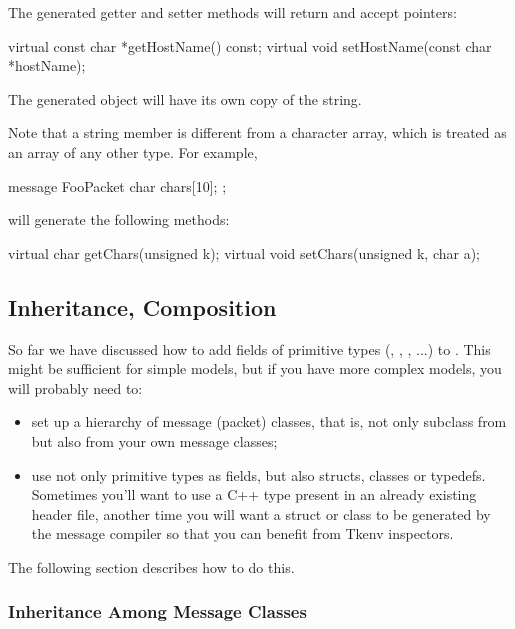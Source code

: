 The generated getter and setter methods will return and accept 
pointers:

\begin{cpp}
virtual const char *getHostName() const;
virtual void setHostName(const char *hostName);
\end{cpp}

The generated object will have its own copy of the string.

Note that a string member is different from a character array,
which is treated as an array of any other type. For example,

\begin{msg}
message FooPacket
{
    char chars[10];
};
\end{msg}

will generate the following methods:

\begin{cpp}
virtual char getChars(unsigned k);
virtual void setChars(unsigned k, char a);
\end{cpp}


\subsection{Inheritance, Composition}

So far we have discussed how to add fields of primitive types
(, , , ...) to
. This might be sufficient for simple models, but if you
have more complex models, you will probably need to:

\begin{itemize}
  \item set up a hierarchy of message (packet) classes, that is,
    not only subclass from  but also from your
    own message classes;
  \item use not only primitive types as fields, but also structs,
    classes or typedefs. Sometimes you'll want to use a C++ type
    present in an already existing header file, another time you will
    want a struct or class to be generated by the message
    compiler so that you can benefit from Tkenv inspectors.
\end{itemize}

The following section describes how to do this.


\subsubsection{Inheritance Among Message Classes}

